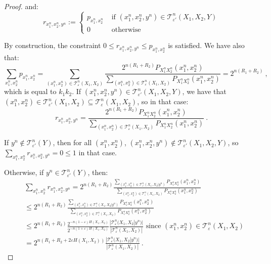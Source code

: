 \begin{proof}
  and:
  \[ r_{x_1^n,x_2^n,y^n} := \begin{cases}
    p_{x_1^n,x_2^n} & \text{ if } (x_1^n,x_2^n,y^n) \in \mathcal{T}^n_{\varepsilon'}(X_1,X_2,Y) \\
    0 & \text{ otherwise}
  \end{cases}
    \]

    By construction, the constraint $0 \leq r_{x_1^n,x_2^n,y^n} \leq p_{x_1^n,x_2^n}$ is satisfied. We have also that:
    \[\sum_{x_1^n,x_2^n} p_{x_1^n,x_2^n} = \sum_{(x_1^n,x_2^n) \in \mathcal{T}^n_{\varepsilon}(X_1,X_2)} \frac{2^{n(R_1+R_2)}P_{X_1^nX_2^n}(x_1^n,x_2^n)}{\sum_{(x_1^n,x_2^n) \in \mathcal{T}^n_{\varepsilon}(X_1,X_2)}P_{X_1^nX_2^n}(x_1^n,x_2^n)} = 2^{n(R_1+R_2)} \ , \]
    which is equal to $k_1k_2$. If $(x_1^n,x_2^n,y^n) \in \mathcal{T}^n_{\varepsilon'}(X_1,X_2,Y)$, we have that $(x_1^n,x_2^n) \in \mathcal{T}^n_{\varepsilon'}(X_1,X_2) \subseteq \mathcal{T}^n_{\varepsilon}(X_1,X_2)$, so in that case:
    \[ r_{x_1^n,x_2^n,y^n} = \frac{2^{n(R_1+R_2)}P_{X_1^nX_2^n}(x_1^n,x_2^n)}{\sum_{(x_1^n,x_2^n) \in \mathcal{T}^n_{\varepsilon}(X_1,X_2)}P_{X_1^nX_2^n}(x_1^n,x_2^n)} \ . \]

    If $y^n \not\in \mathcal{T}^n_{\varepsilon'}(Y)$, then for all $(x_1^n,x_2^n)$, $(x_1^n,x_2^n,y^n) \notin \mathcal{T}^n_{\varepsilon'}(X_1,X_2,Y)$, so $\sum_{x_1^n,x_2^n} r_{x_1^n,x_2^n,y^n}  = 0 \leq 1$ in that case.

    Otherwise, if $y^n \in \mathcal{T}^n_{\varepsilon'}(Y)$, then:
    \begin{equation}
      \begin{aligned}
        &\sum_{x_1^n,x_2^n} r_{x_1^n,x_2^n,y^n} = 2^{n(R_1+R_2)} \frac{\sum_{(x_1^n,x_2^n) \in \mathcal{T}^n_{\varepsilon'}(X_1,X_2|y^n)} P_{X_1^nX_2^n}(x_1^n,x_2^n)}{\sum_{(x_1^n,x_2^n) \in \mathcal{T}^n_{\varepsilon}(X_1,X_2)}P_{X_1^nX_2^n}(x_1^n,x_2^n)}\\
        &\leq 2^{n(R_1+R_2)} \frac{\sum_{(x_1^n,x_2^n) \in \mathcal{T}^n_{\varepsilon}(X_1,X_2|y^n)} P_{X_1^nX_2^n}(x_1^n,x_2^n)}{\sum_{(x_1^n,x_2^n) \in \mathcal{T}^n_{\varepsilon}(X_1,X_2)}P_{X_1^nX_2^n}(x_1^n,x_2^n)}\\
        &\leq 2^{n(R_1+R_2)}\frac{2^{-n(1-\varepsilon)H(X_1,X_2)}}{2^{-n(1+\varepsilon)H(X_1,X_2)}} \frac{|\mathcal{T}^n_{\varepsilon}(X_1,X_2|y^n)|}{|\mathcal{T}^n_{\varepsilon}(X_1,X_2)|} \text{ since $(x_1^n,x_2^n) \in \mathcal{T}^n_{\varepsilon}(X_1,X_2)$} \\
        &= 2^{n(R_1+R_2 + 2\varepsilon H(X_1,X_2))}\frac{|\mathcal{T}^n_{\varepsilon}(X_1,X_2|y^n)|}{|\mathcal{T}^n_{\varepsilon}(X_1,X_2)|} \ .
      \end{aligned}
    \end{equation}


\end{proof}
